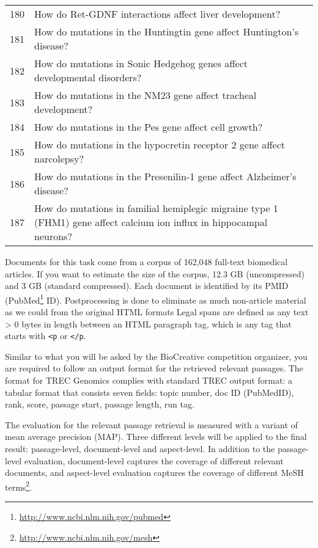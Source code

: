 \begin{table}[t]
\begin{tabular}{lp{32em}}
180 & How do Ret-GDNF interactions affect liver development? \\
181 & How do mutations in the Huntingtin gene affect Huntington's disease? \\
182 & How do  mutations in Sonic Hedgehog genes affect developmental disorders? \\
183 & How do  mutations in the NM23 gene affect tracheal development? \\
184 & How do  mutations in the Pes gene affect cell growth? \\
185 & How do  mutations in the hypocretin receptor 2 gene affect narcolepsy? \\
186 & How do  mutations in the Presenilin-1 gene affect Alzheimer's disease? \\
187 & How do  mutations in familial hemiplegic migraine type 1 (FHM1) gene affect calcium ion influx in hippocampal neurons? \\
\hline
\end{tabular}
\end{table}

Documents for this task come from a corpus of 162,048 full-text biomedical
articles. If you want to estimate the size of the corpus, 12.3 GB (uncompressed)
and 3 GB (standard compressed). Each document is identified by its PMID
(PubMed\footnote{\url{http://www.ncbi.nlm.nih.gov/pubmed}} ID). Postprocessing
is done to eliminate as much non-article material as we could from the original
HTML formats Legal spans are defined as any text > 0 bytes in length between an
HTML paragraph tag, which is any tag that starts with \verb|<p| or \verb|</p|.

Similar to what you will be asked by the BioCreative competition organizer, you
are required to follow an output format for the retrieved relevant passages. The
format for TREC Genomics complies with standard TREC output format: a tabular
format that consists seven fields: topic number, doc ID (PubMedID), rank, score,
passage start, passage length, run tag.

The evaluation for the relevant passage retrieval is measured with a variant of
mean average precision (MAP). Three different levels will be applied to the
final result:
passage-level, document-level and aspect-level. In addition to the passage-level
evaluation, document-level captures the coverage of different relevant
documents, and aspect-level evaluation captures the coverage of different MeSH
terms\footnote{\url{http://www.ncbi.nlm.nih.gov/mesh}}.

